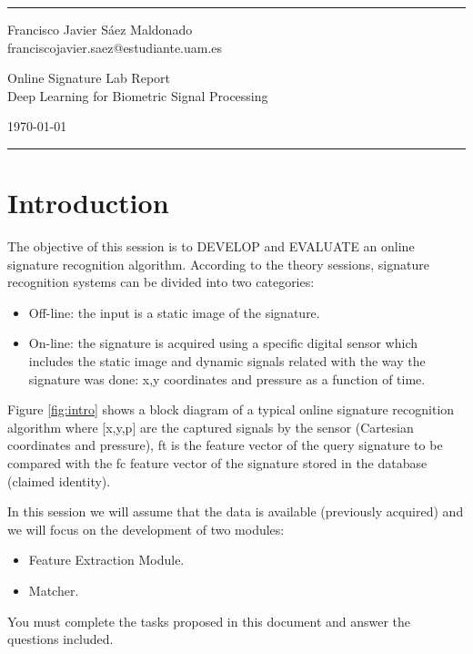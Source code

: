 \documentclass[a4paper]{article}
\begin{document}

\fancyhead[C]{}
\hrule \medskip %
\begin{minipage}{0.295\textwidth}
\raggedright
\footnotesize
Francisco Javier Sáez Maldonado \hfill\\
franciscojavier.saez@estudiante.uam.es
\hfill\\
\end{minipage}
\begin{minipage}{0.4\textwidth}
\centering
\large
Online Signature Lab Report\\
\normalsize
Deep Learning for Biometric Signal Processing\\
\end{minipage}
\begin{minipage}{0.295\textwidth}
\raggedleft
\today\hfill\\
\end{minipage}
\medskip\hrule


\tableofcontents

\section{Introduction}

The objective of this session is to DEVELOP and EVALUATE an online signature recognition algorithm. According to the theory sessions, signature recognition systems can be divided into two categories:

\begin{itemize}
\item	Off-line: the input is a static image of the signature.
\item	On-line: the signature is acquired using a specific digital sensor which includes the static image and dynamic signals related with the way the signature was done: x,y coordinates and pressure as a function of time.
\end{itemize}

Figure \ref{fig:intro} shows a block diagram of a typical online signature recognition algorithm where [x,y,p] are the captured signals by the sensor (Cartesian coordinates and pressure), ft is the feature vector of the query signature to be compared with the fc feature vector of the signature stored in the database (claimed identity). 


In this session we will assume that the data is available (previously acquired) and we will focus on the development of two modules:
\begin{itemize}
\item	Feature Extraction Module.
\item	Matcher.
\end{itemize}
You must complete the tasks proposed in this document and answer the questions included. 
\end{document}
